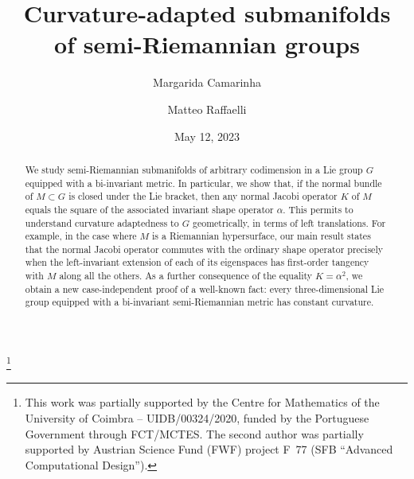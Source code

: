 \documentclass[a4paper,12pt,oneside]{amsart}
\theoremstyle{plain}
\theoremstyle{remark}
\theoremstyle{definition}
\begin{document}
\title[Curvature-adapted submanifolds of Lie groups]{Curvature-adapted submanifolds\\of semi-Riemannian groups}%

\author{Margarida Camarinha}
\address{CMUC\\
University of Coimbra\\
Department of Mathematics\\
3000-143 Coimbra\\
Portugal}
\thanks{This work was partially supported by the Centre for Mathematics of the University of Coimbra -- UIDB/00324/2020, funded by the Portuguese Government through FCT/MCTES.\endgraf
The second author was partially supported by Austrian Science Fund (FWF) project F~77 (SFB ``Advanced Computational Design'').}
\author{Matteo Raffaelli}
\address{CMUC\\
University of Coimbra\\
Department of Mathematics\\
3000-143 Coimbra\\
Portugal}

\date{May 12, 2023}

\begin{abstract}
We study semi-Riemannian submanifolds of arbitrary codimension in a Lie group $G$ equipped with a bi-invariant metric. In particular, we show that, if the normal bundle of $M \subset G$ is closed under the Lie bracket, then any normal Jacobi operator $K$ of $M$ equals the square of the associated invariant shape operator $\alpha$. This permits to understand curvature adaptedness to $G$ geometrically, in terms of left translations. For example, in the case where $M$ is a Riemannian hypersurface, our main result states that the normal Jacobi operator commutes with the ordinary shape operator precisely when the left-invariant extension of each of its eigenspaces has first-order tangency with $M$ along all the others. As a further consequence of the equality $K = \alpha^{2}$, we obtain a new case-independent proof of a well-known fact: every three-dimensional Lie group equipped with a bi-invariant semi-Riemannian metric has constant curvature.
\end{abstract}
\maketitle
\end{document}
